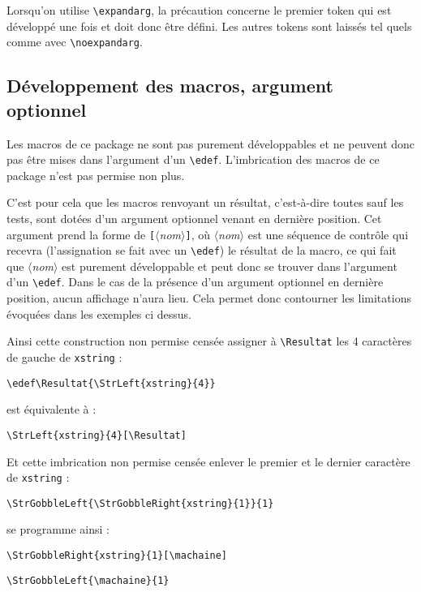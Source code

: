 \documentclass[a4paper,10pt]{article}
\newcommand\argu[1]{$\langle$\textit{#1}$\rangle$}
\newcommand\arguC[1]{\texttt{\color{black}[}\argu{#1}\texttt{\color{black}]}}
\newcommand\verbinline{\lstinline[basicstyle=\normalsize\ttfamily]}
\begin{document}
Lorsqu'on utilise \verbinline|\expandarg|, la précaution concerne le premier token qui est développé une fois et doit donc être défini. Les autres tokens sont laissés tel quels comme avec \verbinline|\noexpandarg|.

\subsection{Développement des macros, argument optionnel}
\label{argumentoptionnel}
Les macros de ce package ne sont pas purement développables et ne peuvent donc pas être mises dans l'argument d'un \verb|\edef|. L'imbrication des macros de ce package n'est pas permise non plus.\medskip

C'est pour cela que les macros renvoyant un résultat, c'est-à-dire toutes sauf les tests, sont dotées d'un argument optionnel venant en dernière position. Cet argument prend la forme de \arguC{nom}, où \argu{nom} est une séquence de contrôle qui recevra (l'assignation se fait avec un \verb|\edef|) le résultat de la macro, ce qui fait que \argu{nom} est purement développable et peut donc se trouver dans l'argument d'un \verb|\edef|. Dans le cas de la présence d'un argument optionnel en dernière position, aucun affichage n'aura lieu. Cela permet donc contourner les limitations évoquées dans les exemples ci dessus.\medskip

Ainsi cette construction non permise censée assigner à \verb|\Resultat| les 4 caractères de gauche de \verb|xstring| :\par\nobreak
\hspace{0.2\linewidth}\verbinline|\edef\Resultat{\StrLeft{xstring}{4}}|\par\nobreak
\qquad est équivalente à :\par\nobreak
\hspace{0.2\linewidth}\verbinline|\StrLeft{xstring}{4}[\Resultat]|\medskip

Et cette imbrication non permise censée enlever le premier et le dernier caractère de \verb|xstring| :\par\nobreak
\hspace{0.2\linewidth}\verbinline|\StrGobbleLeft{\StrGobbleRight{xstring}{1}}{1}|\par\nobreak
\qquad se programme ainsi :\par\nobreak
\hspace{0.2\linewidth}\verbinline|\StrGobbleRight{xstring}{1}[\machaine]|\par\nobreak
\hspace{0.2\linewidth}\verbinline|\StrGobbleLeft{\machaine}{1}|\par
\end{document}
